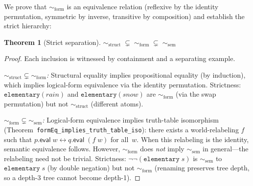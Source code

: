\documentclass[10pt, letterpaper]{article}
\newtheorem{theorem}{Theorem}[section]
\theoremstyle{definition}
\theoremstyle{remark}
\newcommand{\eval}{\mathsf{eval}}
\newcommand{\structEq}{\sim_{\mathrm{struct}}}
\newcommand{\formEq}{\sim_{\mathrm{form}}}
\newcommand{\semEq}{\sim_{\mathrm{sem}}}
\begin{document}
\noindent
We prove that $\formEq$ is an equivalence relation (reflexive by
the identity permutation, symmetric by inverse, transitive by
composition) and establish the strict hierarchy:

\begin{theorem}[Strict separation]
\label{thm:hierarchy}
$\structEq \;\subsetneq\; \formEq \;\subsetneq\; \semEq$
\end{theorem}

\begin{proof}
Each inclusion is witnessed by containment and a separating example.

\emph{$\structEq \subsetneq \formEq$:}
Structural equality implies propositional equality (by induction),
which implies logical-form equivalence via the identity
permutation.  Strictness: $\mathtt{elementary}(\mathit{rain})$
and $\mathtt{elementary}(\mathit{snow})$ are $\formEq$ (via the
swap permutation) but not $\structEq$ (different atoms).

\emph{$\formEq \subsetneq \semEq$:}
Logical-form equivalence implies truth-table isomorphism
(Theorem~\texttt{formEq\_implies\_\allowbreak{}truth\_table\_iso}):
there exists a world-relabeling $f$ such that
$p.\eval\;w \leftrightarrow q.\eval\;(f\;w)$ for all~$w$.
When this relabeling is the identity, semantic equivalence
follows.  However, $\formEq$ does \emph{not} imply $\semEq$ in
general---the relabeling need not be trivial.
Strictness: $\lnot\lnot(\mathtt{elementary}\;s)$
is $\semEq$ to $\mathtt{elementary}\;s$ (by double negation) but
not $\formEq$ (renaming preserves tree depth, so a depth-3 tree
cannot become depth-1).
\end{proof}
\end{document}
